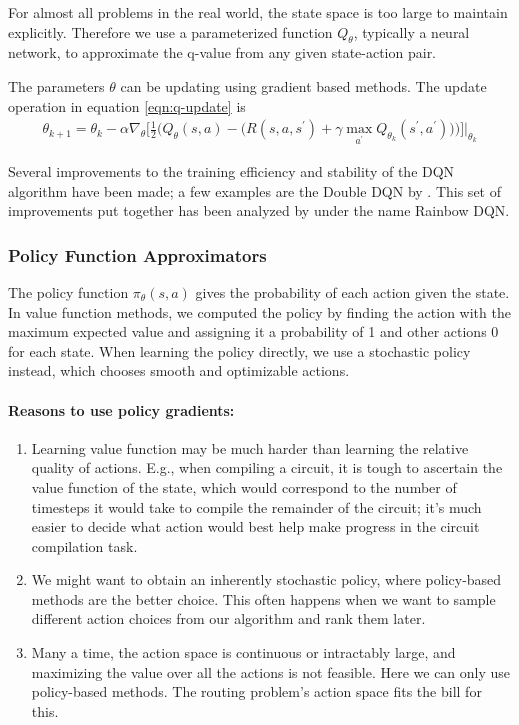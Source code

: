For almost all problems in the real world, the state space is too large to maintain explicitly. Therefore we use a parameterized function $Q_{\theta}$, typically a neural network, to approximate the q-value from any given state-action pair.

The parameters $\theta$ can be updating using gradient based methods. The update operation in equation \ref{eqn:q-update} is 
\begin{equation}
    \label{eqn:q-update}
    \begin{split}
        \theta_{k+1} = \theta_k - \alpha \nabla_\theta \Bigg[\frac{1}{2} \bigg(Q_\theta(s, a) - \Big(R(s, a, s^\prime) + \gamma \max_{a^\prime} Q_{\theta_k}(s^\prime, a^\prime)  \Big) \bigg) \Bigg] \Bigg\vert_{\theta_k}
    \end{split}
\end{equation}

Several improvements to the training efficiency and stability of the DQN algorithm have been made; a few examples are the Double DQN by \cite{double-dqn}. This set of improvements put together has been analyzed by \cite{rainbow-dqn} under the name Rainbow DQN.

\subsubsection{Policy Function Approximators}

The policy function $\pi_\theta(s, a)$ gives the probability of each action given the state. In value function methods, we computed the policy by finding the action with the maximum expected value and assigning it a probability of 1 and other actions 0 for each state. When learning the policy directly, we use a stochastic policy instead, which chooses smooth and optimizable actions.

\paragraph{Reasons to use policy gradients:}
\begin{enumerate}
    \item Learning value function may be much harder than learning the relative quality of actions. E.g., when compiling a circuit, it is tough to ascertain the value function of the state, which would correspond to the number of timesteps it would take to compile the remainder of the circuit; it's much easier to decide what action would best help make progress in the circuit compilation task. 
    \item We might want to obtain an inherently stochastic policy, where policy-based methods are the better choice. This often happens when we want to sample different action choices from our algorithm and rank them later.
    \item Many a time, the action space is continuous or intractably large, and maximizing the value over all the actions is not feasible. Here we can only use policy-based methods. The routing problem's action space fits the bill for this.
\end{enumerate}

